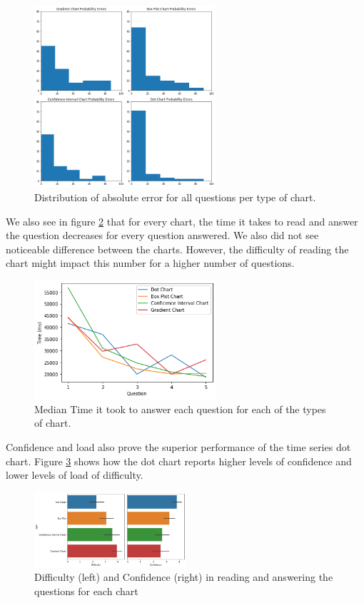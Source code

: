 \documentclass[a4paper,3p,sort&compress]{elsarticle}
\begin{document}
\begin{figure}
  \centering
  \includegraphics[width=0.6\textwidth]{probability_errors}
  \caption{\label{figure:errors}Distribution of absolute error for all questions per type of chart.}
\end{figure}

We also see in figure \ref{figure:duration} that for every chart, the time it takes to read and answer the question decreases for every question answered. We also did not see noticeable difference between the charts. However, the difficulty of reading the chart might impact this number for a higher number of questions.

\begin{figure}
  \centering
   \includegraphics[width=0.6\textwidth]{duration_evo}
  \caption{\label{figure:duration} Median Time it took to answer each question for each of the types of chart.}
\end{figure}  

Confidence and load also prove the superior performance of the time series dot chart. Figure \ref{figure:confi_load} shows how the dot chart reports higher levels of confidence and lower levels of load of difficulty.

\begin{figure}
  \centering
   \includegraphics[width=0.5\textwidth]{confi_load}
  \caption{\label{figure:confi_load} Difficulty (left) and Confidence (right) in reading and answering the questions for each chart}
\end{figure}
\end{document}
